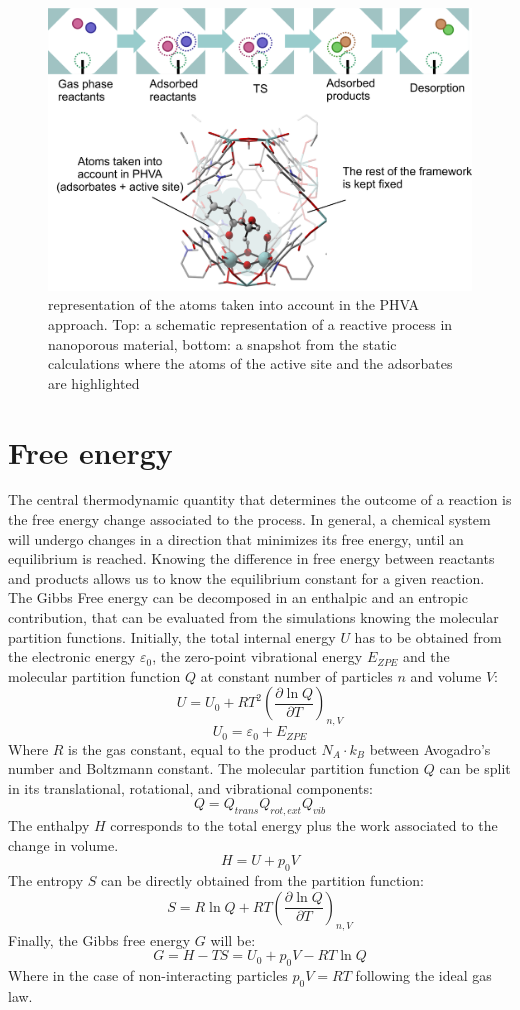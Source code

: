 \begin{figure}[!htbp]
	\centering
 	\includegraphics[width=1.0\textwidth]{PHVA}
	\caption{representation of the atoms taken into account in the PHVA approach. Top: a schematic representation of a reactive process in nanoporous material, bottom: a snapshot from the static calculations where the atoms of the active site and the adsorbates are highlighted}
 \label{fig:PHVA}
\end{figure}

\section{Free energy}
The central thermodynamic quantity that determines the outcome of a reaction is the free energy change associated to the process. In general, a chemical system will undergo changes in a direction that minimizes its free energy, until an equilibrium is reached. Knowing the difference in free energy between reactants and products allows us to know the equilibrium constant for a given reaction. The Gibbs Free energy can be decomposed in an enthalpic and an entropic contribution, that can be evaluated from the simulations knowing the molecular partition functions. Initially, the total internal energy $U$ has to be obtained from the electronic energy $\varepsilon_0$, the zero-point vibrational energy $E_{ZPE}$ and the molecular partition function $Q$ at constant number of particles $n$ and volume $V$:
\[
U = U_{0} + R T^{2}\left(\frac{\partial \ln Q}{\partial T}\right)_{n,V}
\]
\[ U_{0} = \varepsilon_{0} + E_{ZPE} \]
Where $R$ is the gas constant, equal to the product $N_{A}\cdot k_{B}$ between Avogadro's number and Boltzmann constant. The molecular partition function $Q$ can be split in its translational, rotational, and vibrational components:
\[
Q = Q_{trans}Q_{rot, ext}Q_{vib}
\]
The enthalpy $H$ corresponds to the total energy plus the work associated to the change in volume.
\[
H = U + p_{0}V
\] 
The entropy $S$ can be directly obtained from the partition function:
\[
S = R \ln Q + RT \left(\frac{\partial \ln Q}{\partial
T}\right)_{n,V}
\]
Finally, the Gibbs free energy $G$ will be:
\[
G = H - TS = U_{0} + p_{0}V - RT\ln Q
\]
Where in the case of non-interacting particles $p_{0}V = RT$ following the ideal gas law. 


